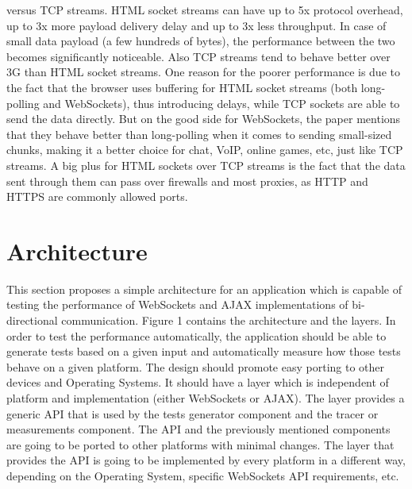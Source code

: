 \documentclass[conference]{IEEEtran}
\begin{document}
versus TCP streams. HTML socket streams can have up to 5x protocol overhead, up to
3x more payload delivery delay and up to 3x less throughput. In case of small
data payload (a few hundreds of bytes), the performance between the two becomes
significantly noticeable. Also TCP streams tend to behave better over 3G than
HTML socket streams.
One reason for the poorer performance is due to the fact that the browser uses
buffering for HTML socket streams (both long-polling and WebSockets), thus 
introducing delays, while TCP sockets are able to send the data directly.
But on the good side for
WebSockets, the paper mentions that they behave better than long-polling when
it comes to sending small-sized chunks, making it a better choice for chat,
VoIP, online games, etc, just like TCP streams. A big plus for HTML sockets
over TCP streams is the fact that the data sent through them can pass over
firewalls and most proxies, as HTTP and HTTPS are commonly allowed ports.

\section{Architecture}
This section proposes a simple architecture for an application which is capable
of testing the performance of WebSockets and AJAX implementations of bi-directional
communication. Figure 1 contains the architecture and the layers. In order to
test the performance automatically, the application should be able to generate
tests based on a given input and automatically measure how those tests behave
on a given platform. The design should promote easy porting to other devices
and Operating Systems. It should have a layer which is independent of 
platform and implementation (either WebSockets or AJAX). The layer provides a generic
API that is used by the tests generator component and the tracer or measurements
component. The API and the previously mentioned components are going to be ported
to other platforms with minimal changes. The layer that provides the API is going
to be implemented by every platform in a different way, depending on the
Operating System, specific WebSockets API requirements, etc.

{}

\end{document}
